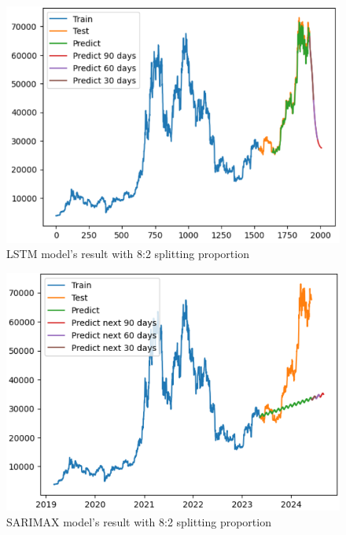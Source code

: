 \documentclass{ieeeojies}
\begin{document}
\begin{figure}[H]
	\centering
	\begin{minipage}{0.6\linewidth}
		\centering
		\includegraphics[width=\linewidth]{bibliography/Images/LSTM_BTC_82.PNG}
		\caption{LSTM model's result with 8:2 splitting proportion}
	\end{minipage}
\end{figure}
\begin{figure}[H]
	\centering
	\begin{minipage}{0.6\linewidth}
		\centering
		\includegraphics[width=\linewidth]{bibliography/Images/SARIMAX_BTC_82.PNG}
		\caption{SARIMAX model's result with 8:2 splitting proportion}
	\end{minipage}
\end{figure}
\end{document}
